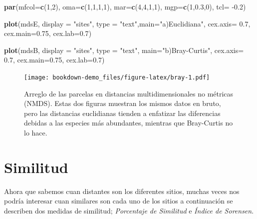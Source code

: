 \documentclass[]{book}
\newenvironment{Shaded}{\begin{snugshade}}{\end{snugshade}}
\newcommand{\KeywordTok}[1]{\textcolor[rgb]{0.13,0.29,0.53}{\textbf{{#1}}}}
\newcommand{\DataTypeTok}[1]{\textcolor[rgb]{0.13,0.29,0.53}{{#1}}}
\newcommand{\DecValTok}[1]{\textcolor[rgb]{0.00,0.00,0.81}{{#1}}}
\newcommand{\FloatTok}[1]{\textcolor[rgb]{0.00,0.00,0.81}{{#1}}}
\newcommand{\StringTok}[1]{\textcolor[rgb]{0.31,0.60,0.02}{{#1}}}
\newcommand{\NormalTok}[1]{{#1}}
\begin{document}
\begin{Shaded}
\begin{Highlighting}[]
\KeywordTok{par}\NormalTok{(}\DataTypeTok{mfcol=}\KeywordTok{c}\NormalTok{(}\DecValTok{1}\NormalTok{,}\DecValTok{2}\NormalTok{), }\DataTypeTok{oma=}\KeywordTok{c}\NormalTok{(}\DecValTok{1}\NormalTok{,}\DecValTok{1}\NormalTok{,}\DecValTok{1}\NormalTok{,}\DecValTok{1}\NormalTok{), }\DataTypeTok{mar=}\KeywordTok{c}\NormalTok{(}\DecValTok{4}\NormalTok{,}\DecValTok{4}\NormalTok{,}\DecValTok{1}\NormalTok{,}\DecValTok{1}\NormalTok{),}
    \DataTypeTok{mgp=}\KeywordTok{c}\NormalTok{(}\DecValTok{1}\NormalTok{,}\FloatTok{0.3}\NormalTok{,}\DecValTok{0}\NormalTok{), }\DataTypeTok{tcl=} \NormalTok{-}\FloatTok{0.2}\NormalTok{)}

\KeywordTok{plot}\NormalTok{(mdsE, }\DataTypeTok{display =} \StringTok{"sites"}\NormalTok{, }
     \DataTypeTok{type =} \StringTok{"text"}\NormalTok{,}\DataTypeTok{main=}\StringTok{"a)Euclidiana"}\NormalTok{, }
     \DataTypeTok{cex.axis=} \FloatTok{0.7}\NormalTok{, }\DataTypeTok{cex.main=}\FloatTok{0.75}\NormalTok{, }\DataTypeTok{cex.lab=}\FloatTok{0.7}\NormalTok{)}

\KeywordTok{plot}\NormalTok{(mdsB, }\DataTypeTok{display =} \StringTok{"sites"}\NormalTok{, }\DataTypeTok{type =} \StringTok{"text"}\NormalTok{, }
     \DataTypeTok{main=}\StringTok{"b)Bray-Curtis"}\NormalTok{, }
     \DataTypeTok{cex.axis=} \FloatTok{0.7}\NormalTok{, }\DataTypeTok{cex.main=}\FloatTok{0.75}\NormalTok{, }\DataTypeTok{cex.lab=}\FloatTok{0.7}\NormalTok{)}
\end{Highlighting}
\end{Shaded}

\begin{figure}[htbp]
\centering
\texttt{[image: bookdown-demo\_files/figure-latex/bray-1.pdf]}
\caption{\label{fig:bray}Arreglo de las parcelas en distancias
multidimensionales no métricas (NMDS). Estas dos figuras muestran los
mismos datos en bruto, pero las distancias euclidianas tienden a
enfatizar las diferencias debidas a las especies más abundantes,
mientras que Bray-Curtis no lo hace.}
\end{figure}

\section{Similitud}\label{similitud}

Ahora que sabemos cuan distantes son los diferentes sitios, muchas veces
nos podría interesar cuan similares son cada uno de los sitios a
continuación se describen dos medidas de similitud; \emph{Porcentaje de
Similitud} e \emph{Índice de Sorensen}.
\end{document}
